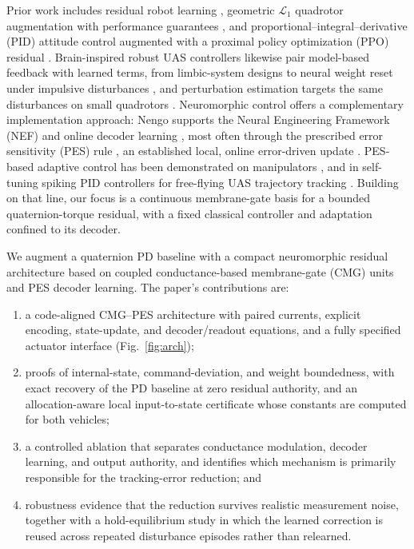 \documentclass[letterpaper, 10 pt, conference]{ieeeconf}
\begin{document}
Prior work includes residual robot learning \cite{johannink2019}, geometric $\mathcal L_1$ quadrotor augmentation with performance guarantees \cite{wu2025l1quad}, and proportional--integral--derivative (PID) attitude control augmented with a proximal policy optimization (PPO) residual \cite{li2027hpappo}.
%
Brain-inspired robust UAS controllers likewise pair model-based feedback with learned terms, from limbic-system designs \cite{rubioscola2023limbic,escareno2024limbic} to neural weight reset under impulsive disturbances \cite{rubioscola2023weightreset}, and perturbation estimation targets the same disturbances on small quadrotors \cite{rubioscola2021mambo}.
Neuromorphic control offers a complementary implementation approach: Nengo supports the Neural Engineering Framework (NEF) \cite{eliasmith2004neuraleng} and online decoder learning \cite{bekolay2014nengo}, most often through the prescribed error sensitivity (PES) rule \cite{macneil2011pes}, an established local, online error-driven update \cite{voelker2015pes}. PES-based adaptive control has been demonstrated on manipulators \cite{dewolf2016arm,dewolf2020nengo}, and in self-tuning spiking PID controllers for free-flying UAS trajectory tracking \cite{olivares2025ifac,olivares2026selftuning}.
Building on that line, our focus is a continuous membrane-gate basis for a bounded quaternion-torque residual, with a fixed classical controller and adaptation confined to its decoder.

We augment a quaternion PD baseline with a compact neuromorphic residual architecture based on coupled conductance-based membrane-gate (CMG) units and PES decoder learning. The paper's contributions are:
\begin{enumerate}
    \item a code-aligned CMG--PES architecture with paired currents, explicit encoding, state-update, and decoder/readout equations, and a fully specified actuator interface (Fig.~\ref{fig:arch});
    \item proofs of internal-state, command-deviation, and weight boundedness, with exact recovery of the PD baseline at zero residual authority, and an allocation-aware local input-to-state certificate whose constants are computed for both vehicles;
    \item a controlled ablation that separates conductance modulation, decoder learning, and output authority, and identifies which mechanism is primarily responsible for the tracking-error reduction; and
    \item robustness evidence that the reduction survives realistic measurement noise, together with a hold-equilibrium study in which the learned correction is reused across repeated disturbance episodes rather than relearned.
\end{enumerate}
\end{document}
